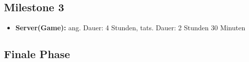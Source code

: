 \documentclass{article}
\begin{document}
\subsection{Milestone 3}
\begin{itemize}
\item \textbf{Server(Game):} ang. Dauer: 4 Stunden, tats. Dauer: 2 Stunden 30 Minuten
\end{itemize}

 
\subsection{Finale Phase}
\end{document}
